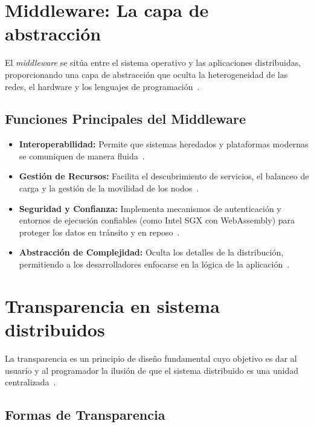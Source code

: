 \documentclass[12pt,a4paper]{article}
\begin{document}
\section{Middleware: La capa de abstracción}

El \textit{middleware} se sitúa entre el sistema operativo y las aplicaciones distribuidas, proporcionando una capa de abstracción que oculta la heterogeneidad de las redes, el hardware y los lenguajes de programación~\cite{r10}.

\subsection{Funciones Principales del Middleware}

\begin{itemize}
    \item \textbf{Interoperabilidad:} Permite que sistemas heredados y plataformas modernas se comuniquen de manera fluida~\cite{r13}.

    \item \textbf{Gestión de Recursos:} Facilita el descubrimiento de servicios, el balanceo de carga y la gestión de la movilidad de los nodos~\cite{r04}.

    \item \textbf{Seguridad y Confianza:} Implementa mecanismos de autenticación y entornos de ejecución confiables (como Intel SGX con WebAssembly) para proteger los datos en tránsito y en reposo~\cite{r05}.

    \item \textbf{Abstracción de Complejidad:} Oculta los detalles de la distribución, permitiendo a los desarrolladores enfocarse en la lógica de la aplicación~\cite{r14}.
\end{itemize}

\section{Transparencia en sistema distribuidos}

La transparencia es un principio de diseño fundamental cuyo objetivo es dar al usuario y al programador la ilusión de que el sistema distribuido es una unidad centralizada~\cite{r15}.

\subsection{Formas de Transparencia}
\end{document}
